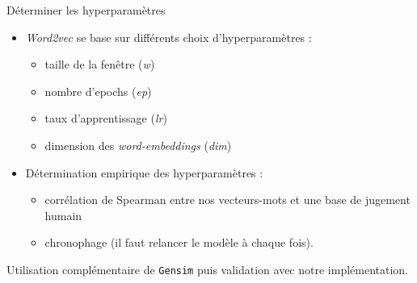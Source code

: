 \documentclass[10pt,xcolor=table,color={dvipsnames,usenames},ignorenonframetext,usepdftitle=false,french]{beamer}
\providecommand{\tightlist}{%
  \setlength{\parskip}{0pt}
  }
\begin{document}
\begin{frame}{Déterminer les hyperparamètres}
\protect\hypertarget{duxe9terminer-les-hyperparamuxe8tres}{}

\begin{itemize}
\tightlist
\item
  \emph{Word2vec} se base sur différents choix d’hyperparamètres :

  \begin{itemize}
  \tightlist
  \item
    taille de la fenêtre (\emph{w})
  \item
    nombre d’epochs (\emph{ep})
  \item
    taux d’apprentissage (\emph{lr})
  \item
    dimension des \emph{word-embeddings} (\emph{dim})
  \end{itemize}
\end{itemize}

\medskip

\begin{itemize}
\tightlist
\item
  Détermination empirique des hyperparamètres :

  \begin{itemize}
  \tightlist
  \item
    corrélation de Spearman entre nos vecteurs-mots et une base de
    jugement humain
  \item
    chronophage (il faut relancer le modèle à chaque fois).
  \end{itemize}
\end{itemize}

\medskip

\faArrowCircleRight{} Utilisation complémentaire de \texttt{Gensim} puis
validation avec notre implémentation.

\end{frame}
\end{document}
